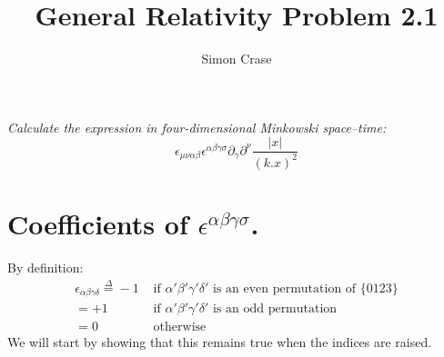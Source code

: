 \documentclass[10pt,a4paper]{article}
\author{Simon Crase}
\title{General Relativity Problem 2.1}
\begin{document}
	\maketitle
	\thispagestyle{fancy}%
	\emph{Calculate the expression in four-dimensional Minkowski space--time:}
	\begin{equation}
	\epsilon_{\mu\nu\alpha\beta}\epsilon^{\alpha\beta\gamma\sigma}\partial_{\gamma}\partial^{\nu}\frac{\lvert x \rvert}{(k.x)^{2}}
	\end{equation}

	\section{Coefficients of $\epsilon^{\alpha\beta\gamma\sigma}$.}
		By definition:
	\begin{align}
		\epsilon_{\alpha\beta\gamma\delta} \overset{\Delta}{=} -1&\text{ if $\alpha'\beta'\gamma'\delta'$ is an even permutation of \{0123\}} \\
		= +1&\text { if $\alpha'\beta'\gamma'\delta'$  is an odd permutation}\\
		= 0&\text { otherwise}
	\end{align}
	We will start by showing that this remains true when the indices are raised.
	
\end{document}
